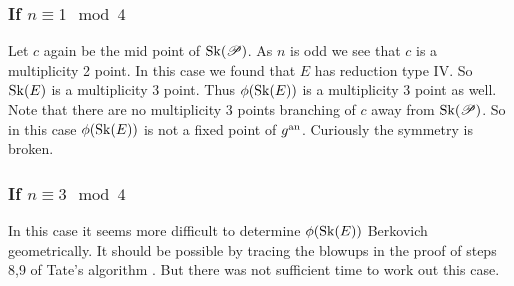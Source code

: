 \subsubsection{If $n \equiv 1 \mod 4$} \label{sec:if_n_equiv_1_mod_4$}

Let $c$ again be the mid point of $\operatorname{Sk}(\mathscr P)$. 
As $n$ is odd we see that $c$ is a multiplicity 2 point. 
In this case we found that $E$ has reduction type $\mathrm{IV}$. 
So $\operatorname{Sk}(E)$ is a multiplicity 3 point. 
Thus $\phi(\sk(E))$ is a multiplicity 3 point as well. 
Note that there are no multiplicity 3 points branching of $c$ away from $\operatorname{Sk}(\mathscr P)$. 
So in this case  $\phi(\sk(E))$ is not a fixed point of $g{}^{\text{an}}$.  
Curiously the symmetry is broken. 


\subsubsection{If $n \equiv 3 \mod 4$ } \label{sec:if_n_equiv_3_mod_4}
In this case it seems more difficult to determine $\phi(\sk(E))$ Berkovich geometrically. 
It should be possible by tracing the blowups in the proof of steps 8,9 of Tate's algorithm \cite[p. 374-376]{silvermanAdvancedTopicsArithmetic1994}.
But there was not sufficient time to work out this case. 

